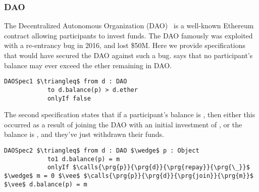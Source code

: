 \subsubsection{DAO}
The Decentralized Autonomous Organization (DAO)~\cite{Dao}  is a well-known Ethereum contract allowing 
participants to invest funds. The DAO famously was exploited with a re-entrancy bug in 2016, 
and lost \$50M. Here we provide specifications that would have secured the DAO against such a 
bug.  says that no participant's balance may ever exceed the ether remaining 
in DAO.
\begin{lstlisting}[language = Chainmail, mathescape=true, frame=lines]
DAOSpec1 $\triangleq$ from d : DAO
            to d.balance(p) > d.ether
            onlyIf false
\end{lstlisting}
The second specification  states that if a participant's balance is , then 
either this occurred as a result of joining the DAO with an initial investment of , or the
balance is , and they've just withdrawn their funds.
\begin{lstlisting}[language = Chainmail, mathescape=true, frame=lines]
DAOSpec2 $\triangleq$ from d : DAO $\wedge$ p : Object
            to1 d.balance(p) = m
            onlyIf $\calls{\prg{p}}{\prg{d}}{\prg{repay}}{\prg{\_}}$ $\wedge$ m = 0 $\vee$ $\calls{\prg{p}}{\prg{d}}{\prg{join}}{\prg{m}}$ $\vee$ d.balance(p) = m
\end{lstlisting}
